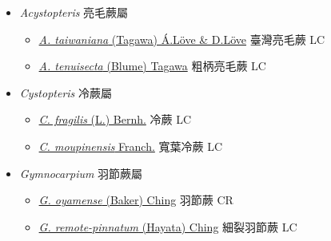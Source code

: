 
  \begin{itemize}
 \item[    ] \textit{Acystopteris} 亮毛蕨屬
                                
  \begin{itemize}
        \item[] \href{http://www.theplantlist.org/tpl1.1/search?q=Acystopteris+taiwaniana}{\textit{A. taiwaniana} (Tagawa) Á.Löve \& D.Löve}   臺灣亮毛蕨   LC
        \item[] \href{http://www.theplantlist.org/tpl1.1/search?q=Acystopteris+tenuisecta}{\textit{A. tenuisecta} (Blume) Tagawa}   粗柄亮毛蕨   LC
  \end{itemize}
 \item[    ] \textit{Cystopteris} 冷蕨屬
                                
  \begin{itemize}
        \item[] \href{http://www.theplantlist.org/tpl1.1/search?q=Cystopteris+fragilis}{\textit{C. fragilis} (L.) Bernh.}   冷蕨   LC
        \item[] \href{http://www.theplantlist.org/tpl1.1/search?q=Cystopteris+moupinensis}{\textit{C. moupinensis} Franch.}   寬葉冷蕨   LC
  \end{itemize}
 \item[    ] \textit{Gymnocarpium} 羽節蕨屬
                                
  \begin{itemize}
        \item[] \href{http://www.theplantlist.org/tpl1.1/search?q=Gymnocarpium+oyamense}{\textit{G. oyamense} (Baker) Ching}   羽節蕨   CR
        \item[] \href{http://www.theplantlist.org/tpl1.1/search?q=Gymnocarpium+remote-pinnatum}{\textit{G. remote-pinnatum} (Hayata) Ching}   細裂羽節蕨   LC
  \end{itemize}
  \end{itemize}
